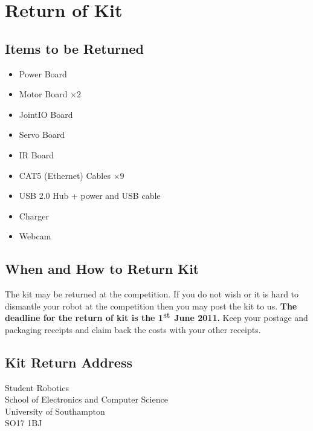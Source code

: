 \section {Return of Kit}
\label{sec:kit-return}

\subsection {Items to be Returned}

\begin{itemize}
\item Power Board
\item Motor Board $\times 2$
\item JointIO Board
\item Servo Board
\item IR Board
\item CAT5 (Ethernet) Cables $\times 9$
\item USB 2.0 Hub + power and USB cable
\item Charger
\item Webcam
\end{itemize}

\subsection {When and How to Return Kit}

The kit may be returned at the competition. If you do not wish or it is hard
to dismantle your robot at the competition then you may post the kit to us.
\textbf{The deadline for the return of kit is the 1$^{\hbox{st}}$ June 2011.}
Keep your postage and packaging receipts and claim back the costs with your
other receipts.

\subsection {Kit Return Address}

Student Robotics\\
School of Electronics and Computer Science\\
University of Southampton\\
SO17 1BJ
